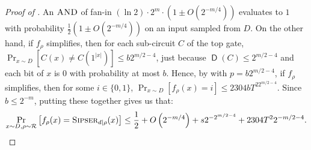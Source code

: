 \documentclass[10pt,a4paper]{article}
\newcommand{\Sipser}{\normalfont\textsc{Sipser}}
\newcommand{\AND}{\normalfont\textsc{AND}} %
\DeclareMathOperator{\D}{\mathsf{D}}
\begin{document}
\begin{proof}[Proof of ]
An $\AND$ of fan-in $(\ln 2) \cdot 2^m \cdot \left(1 \pm O\left(2^{-m/4}\right)\right)$ evaluates to $1$ with probability $\frac{1}{2}\left(1 \pm O\left(2^{-m/4}\right)\right)$ on an input sampled from $D$. On the other hand, if $f_\rho$ simplifies, then for each sub-circuit $C$ of the top gate, $\Pr_{x \sim D}\left[C(x) \neq C\left(1^{|x|}\right)\right] \le b2^{m/2-4}$, just because $\D(C) \le 2^{m/2-4}$ and each bit of $x$ is $0$ with probability at most $b$. Hence, by  with $p=b2^{m/2-4}$, if $f_\rho$ simplifies, then for some $i \in \{0,1\}$, $\Pr_{x \sim D}\left[f_\rho(x) = i\right] \le 2304bT^22^{m/2-4}$. Since $b \le 2^{-m}$, putting these together gives us that:
\[
\Pr_{x \sim D, \rho \sim \mathcal{R}}\left[f_\rho(x) = \Sipser_{d|\rho} (x)\right] \le \frac{1}{2} + O\left(2^{-m/4}\right) + s2^{-2^{m/2-4}} + 2304 T^22^{-m/2-4} .\qedhere
\]

\end{proof}
\end{document}
